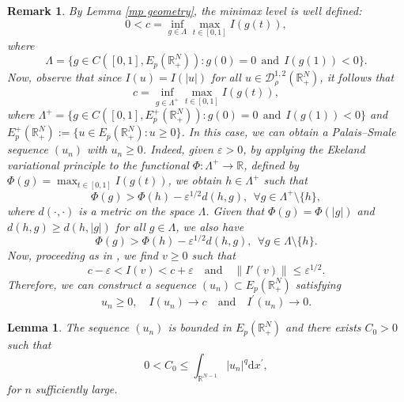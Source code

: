 \documentclass[12pt,reqno]{amsart}
\newtheorem{lemma}[theorem]{Lemma}
\newtheorem{remark}{Remark}[section]
\begin{document}
\begin{remark}\label{Nonnegative ps sequence}
By Lemma \ref{mp geometry}, the minimax level is well defined:
\begin{equation*}
   0< c= \inf_{g \in \Lambda } \max_{t \in [0,1]}I(g(t)),
\end{equation*}
where 
\begin{equation*}
\Lambda=\{g \in C([0,1], E_p(\mathds{R}^N_+)): g(0)=0~~\text{and}~~ I(g(1))<0\}.
\end{equation*} 
Now, observe that since $I(u)=I(|u|)$ for all $u \in \mathcal{D}^{1,2}_\rho(\mathds{R}^N_+)$, it follows that 
\begin{equation*}
    c = \inf_{g\in\Lambda^+}\max_{t\in[0,1]}I(g(t)),
\end{equation*}
where $\Lambda^+=\{g \in C([0,1], E_p^+(\mathds{R}^N_+)): g(0)=0~~\text{and}~~ I(g(1))<0\}$ and $E_p^+(\mathds{R}^N_+):= \{u \in E_p(\mathds{R}^N_+): u\geq 0\}$. In this case, we can obtain a Palais–Smale sequence $(u_n)$ with $u_n\geq 0$. Indeed, given $\varepsilon>0$, by applying the Ekeland variational principle to the functional $\Phi:\Lambda^+\longrightarrow \mathds{R}$, defined by $\Phi(g)=\max_{t \in [0,1]}I(g(t))$, we obtain $h \in \Lambda^+$ such that
\begin{equation*}
    \Phi(g)>\Phi(h)-\varepsilon^{1/2}d(h,g),~~\forall g\in \Lambda^+\setminus\{h\}, 
\end{equation*}
where $d(\cdot,\cdot)$ is a metric on the space $\Lambda$. Given that $\Phi(g)=\Phi(|g|)$ and $d(h,g)\geq d(h,|g|)$ for all $g\in \Lambda$, we also have
\begin{equation*}
    \Phi(g)>\Phi(h)-\varepsilon^{1/2}d(h,g),~~\forall g\in \Lambda\setminus\{h\}.
\end{equation*}
Now, proceeding as in \cite[Theorem 4.3]{mawhin-willem}, we find $v\geq 0$ such that
\begin{equation*}
    c-\varepsilon<I(v)<c+\varepsilon\quad\text{and}\quad \|I'(v)\|\leq \varepsilon^{1/2}.
\end{equation*}
Therefore, we can construct a sequence $(u_n)\subset E_p(\mathds{R}^N_+)$ satisfying
\begin{equation}\label{nonnegative Ps seq}
u_n\geq 0, \quad    I(u_n)\longrightarrow c\quad\text{and}\quad I^\prime(u_n)\longrightarrow 0.    
\end{equation}
\end{remark}


\begin{lemma}\label{limitacao inferior} The sequence $(u_n)$ is bounded in $E_p(\mathds{R}^N_+)$ and there exists $C_0>0$ such that
\begin{equation}\label{desigualdade rho}
0<C_0\leq \int_{\mathds{R}^{N-1}}|u_n|^q\mathrm{d}x^\prime,  
\end{equation}
for $n$ sufficiently large.
\end{lemma}
\end{document}
